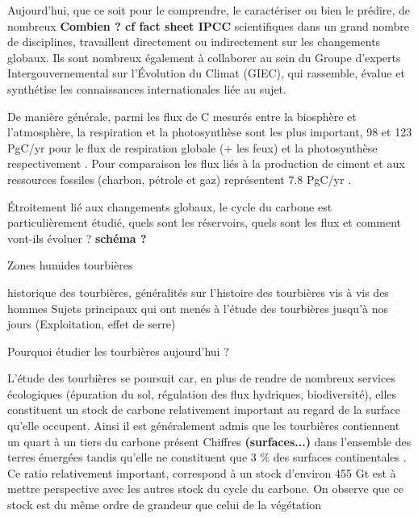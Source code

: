 Aujourd'hui, que ce soit pour le comprendre, le caractériser ou bien le prédire, de nombreux \textbf{Combien ? cf fact sheet IPCC} scientifiques dans un grand nombre de disciplines, travaillent directement ou indirectement sur les changements globaux.
Ils sont nombreux également à collaborer au sein du  Groupe d'experts Intergouvernemental sur l'Évolution du Climat (GIEC), qui rassemble, évalue et synthétise les connaissances internationales liée au sujet.

De manière générale, parmi les flux de C mesurés entre la biosphère et l'atmosphère, la respiration et la photosynthèse sont les plus  important, 98 et 123 PgC/yr pour le flux de respiration globale (+ les feux) et la photosynthèse respectivement \cite{Bond-Lamberty2010,Beer2010}. Pour comparaison les flux liés à la production de ciment et aux ressources fossiles (charbon, pétrole et gaz) représentent 7.8 PgC/yr \cite{Ciais2014}.

Étroitement lié aux changements globaux, le cycle du carbone est particulièrement étudié, quels sont les réservoirs, quels sont les flux et comment vont-ils évoluer ? 
\textbf{schéma ?}


Zones humides tourbières

historique des tourbières, généralités sur l'histoire des tourbières vis à vis des hommes
Sujets principaux qui ont menés à l’étude des tourbières jusqu'à nos jours (Exploitation, effet de serre)

Pourquoi étudier les tourbières aujourd’hui ? 





L'étude des tourbières se poursuit car, en plus de rendre de nombreux services écologiques  (épuration du sol, régulation des flux hydriques, biodiversité), elles constituent un stock de carbone relativement important au regard de la surface qu'elle occupent. Ainsi il est généralement admis que les tourbières contiennent un quart à un tiers du carbone présent Chiffres \textbf{(surfaces...)} dans l'ensemble des terres émergées tandis qu'elle ne constituent que 3 \% des surfaces continentales \plop. Ce ratio relativement important, correspond à un stock d'environ 455 Gt \cite{gorham1991,turunen2002} est à mettre perspective avec les autres stock du cycle du carbone. On observe que ce stock est du même ordre de grandeur que celui de la végétation 

